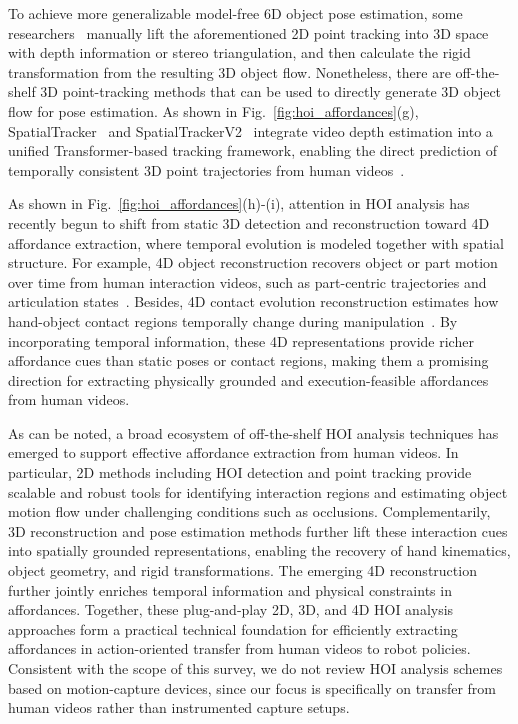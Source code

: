 \documentclass[Afour,sageh,times]{sagej}
\begin{document}
To achieve more generalizable model-free 6D object pose estimation, some researchers~\citep{bharadhwaj2024track2act,zhu2024vision,haldar2025point,liu2025egozero,tang2025functo} manually lift the aforementioned 2D point tracking into 3D space with depth information or stereo triangulation, and then calculate the rigid transformation from the resulting 3D object flow. Nonetheless, there are off-the-shelf 3D point-tracking methods that can be used to directly generate 3D object flow for pose estimation. As shown in Fig.~\ref{fig:hoi_affordances}(g), SpatialTracker~\citep{xiao2024spatialtracker} and SpatialTrackerV2~\citep{xiao2025spatialtrackerv2} integrate video depth estimation into a unified Transformer-based tracking framework, enabling the direct prediction of temporally consistent 3D point trajectories from human videos~\citep{hsieh2025dexman,yoshida2025generating,yoshida2025developing}.

As shown in Fig.~\ref{fig:hoi_affordances}(h)-(i), attention in HOI analysis has recently begun to shift from static 3D detection and reconstruction toward 4D affordance extraction, where temporal evolution is modeled together with spatial structure. For example, 4D object reconstruction recovers object or part motion over time from human interaction videos, such as part-centric trajectories and articulation states~\citep{kerr2024robot,wang2026paws}. Besides, 4D contact evolution reconstruction estimates how hand-object contact regions temporally change during manipulation~\citep{cong2025dytact}. By incorporating temporal information, these 4D representations provide richer affordance cues than static poses or contact regions, making them a promising direction for extracting physically grounded and execution-feasible affordances from human videos.


As can be noted, a broad ecosystem of off-the-shelf HOI analysis techniques has emerged to support effective affordance extraction from human videos. In particular, 2D methods including HOI detection and point tracking provide scalable and robust tools for identifying interaction regions and estimating object motion flow under challenging conditions such as occlusions. Complementarily, 3D reconstruction and pose estimation methods further lift these interaction cues into spatially grounded representations, enabling the recovery of hand kinematics, object geometry, and rigid transformations. The emerging 4D reconstruction further jointly enriches temporal information and physical constraints in affordances. Together, these plug-and-play 2D, 3D, and 4D HOI analysis approaches form a practical technical foundation for efficiently extracting affordances in action-oriented transfer from human videos to robot policies. Consistent with the scope of this survey, we do not review HOI analysis schemes based on motion-capture devices, since our focus is specifically on transfer from human videos rather than instrumented capture setups.
\end{document}
